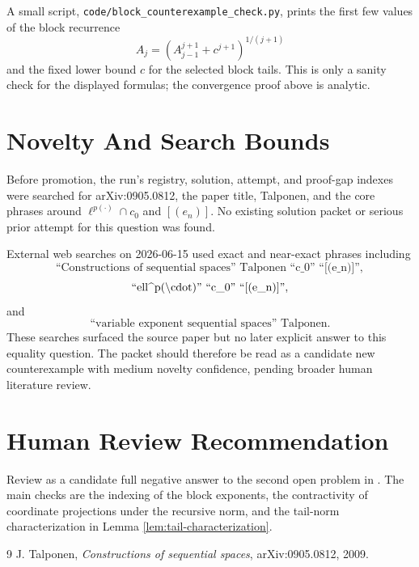 \documentclass[11pt]{amsart}
\begin{document}
A small script, \texttt{code/block\_counterexample\_check.py}, prints the first few
values of the block recurrence
\[
  A_j=(A_{j-1}^{j+1}+c^{j+1})^{1/(j+1)}
\]
and the fixed lower bound \(c\) for the selected block tails.  This is only a
sanity check for the displayed formulas; the convergence proof above is
analytic.

\section*{Novelty And Search Bounds}

Before promotion, the run's registry, solution, attempt, and proof-gap indexes
were searched for arXiv:0905.0812, the paper title, Talponen, and the core
phrases around \(\ell^{p(\cdot)}\cap c_0\) and \([(e_n)]\).  No existing
solution packet or serious prior attempt for this question was found.

External web searches on 2026-06-15 used exact and near-exact phrases
including
\[
\text{``Constructions of sequential spaces'' Talponen ``c\_0'' ``[(e\_n)]''},
\]
\[
\text{``ell\string^{p(\textbackslash cdot)}'' ``c\_0'' ``[(e\_n)]''},
\]
and
\[
\text{``variable exponent sequential spaces'' Talponen}.
\]
These searches surfaced the source paper but no later explicit answer to this
equality question.  The packet should therefore be read as a candidate new
counterexample with medium novelty confidence, pending broader human
literature review.

\section*{Human Review Recommendation}

Review as a candidate full negative answer to the second open problem in
\cite{Talponen}.  The main checks are the indexing of the block exponents, the
contractivity of coordinate projections under the recursive norm, and the
tail-norm characterization in Lemma \ref{lem:tail-characterization}.

\begin{thebibliography}{9}
J. Talponen,
\emph{Constructions of sequential spaces},
arXiv:0905.0812, 2009.
\end{thebibliography}
\end{document}
